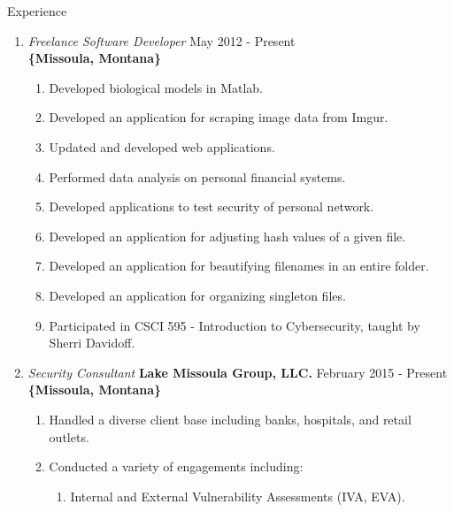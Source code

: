 \documentclass[oneside]{article}%
\begin{document}

\renewcommand{\footrulewidth}{1pt}


\noindent
\huge{Experience}
\small
\begin{enumerate}[]
	\item \textit{Freelance Software Developer} \hfill May 2012 - Present\\
		\textbf{\{Missoula, Montana\}}
		\begin{enumerate}[*]
			\item Developed biological models in Matlab.
			\item Developed an application for scraping image data from Imgur.
			\item Updated and developed web applications.
			\item Performed data analysis on personal financial systems.
			\item Developed applications to test security of personal network.
			\item Developed an application for adjusting hash values of a given file.
			\item Developed an application for beautifying filenames in an entire folder.
			\item Developed an application for organizing singleton files.
			\item Participated in CSCI 595 - Introduction to Cybersecurity, taught by Sherri Davidoff.
		\end{enumerate}
	\item \textit{Security Consultant} \textbf{Lake Missoula Group, LLC.} \hfill February 2015 - Present\\
		\textbf{\{Missoula, Montana\}}
		\begin{enumerate}[*]
			\item Handled a diverse client base including banks, hospitals, and retail outlets.
			\item Conducted a variety of engagements including:
				\begin{enumerate}[.]
					\item Internal and External Vulnerability Assessments (IVA, EVA).

\end{enumerate}
\end{enumerate}
\end{enumerate}
\end{document}
